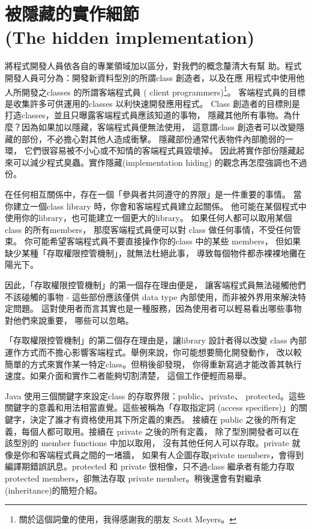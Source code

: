 \section{被隱藏的實作細節 \\(The hidden implementation)}
將程式開發人員依各自的專業領域加以區分，對我們的概念釐清大有幫
助。程式開發人員可分為：開發新資料型別的所謂class 創造者，以及在應
用程式中使用他人所開發之classes 的所謂客端程式員
( client programmers)\footnote{關於這個詞彙的使用，我得感謝我的朋友 Scott
Meyers。}。 客端程式員的目標是收集許多可供運用的classes 以利快速開發應用程式。
Class 創造者的目標則是打造classes，並且只曝露客端程式員應該知道的事物，
隱藏其他所有事物。為什麼？因為如果加以隱藏，客端程式員便無法使用，
這意謂class 創造者可以改變隱藏的部份，不必擔心對其他人造成衝擊。
隱藏部份通常代表物件內部脆弱的一環，
它們很容易被不小心或不知情的客端程式員毀壞掉。
因此將實作部份隱藏起來可以減少程式臭蟲。實作隱藏(implementation hiding)
的觀念再怎麼強調也不過份。

在任何相互關係中，存在一個「參與者共同遵守的界限」是一件重要的事情。
當你建立一個class library 時，你會和客端程式員建立起關係。
他可能在某個程式中使用你的library，也可能建立一個更大的library。
如果任何人都可以取用某個 class 的所有members，
那麼客端程式員便可以對 class 做任何事情，不受任何管束。
你可能希望客端程式員不要直接操作你的class 中的某些 members，
但如果缺少某種「存取權限控管機制」，就無法杜絕此事，
導致每個物件都赤裸裸地攤在陽光下。

因此，「存取權限控管機制」的第一個存在理由便是，
讓客端程式員無法碰觸他們不該碰觸的事物 - 這些部份應該僅供
data type 內部使用，而非被外界用來解決特定問題。
這對使用者而言其實也是一種服務，因為使用者可以輕易看出哪些事物對他們來說重要，
哪些可以忽略。

「存取權限控管機制」的第二個存在理由是，讓library 設計者得以改變
class 內部運作方式而不擔心影響客端程式。舉例來說，你可能想要簡化開發動作，
改以較簡單的方式來實作某一特定class。但稍後卻發現，
你得重新寫過才能改善其執行速度。如果介面和實作二者能夠切割清楚，
這個工作便輕而易舉。

Java 使用三個關鍵字來設定class 的存取界限：public、private、
protected。這些關鍵字的意義和用法相當直覺。這些被稱為「存取指定詞
(access specifiers)」的關鍵字，決定了誰才有資格使用其下所定義的東西。
接續在 public 之後的所有定義，每個人都可取用。接續在 private 之後的所有定義，
除了型別開發者可以在該型別的 member functions 中加以取用，
沒有其他任何人可以存取。private 就像是你和客端程式員之間的一堵牆，
如果有人企圖存取private members，會得到編譯期錯誤訊息。protected 和
private 很相像，只不過class 繼承者有能力存取 protected members，卻無法存取
private member。稍後還會有對繼承 (inheritance)的簡短介紹。

